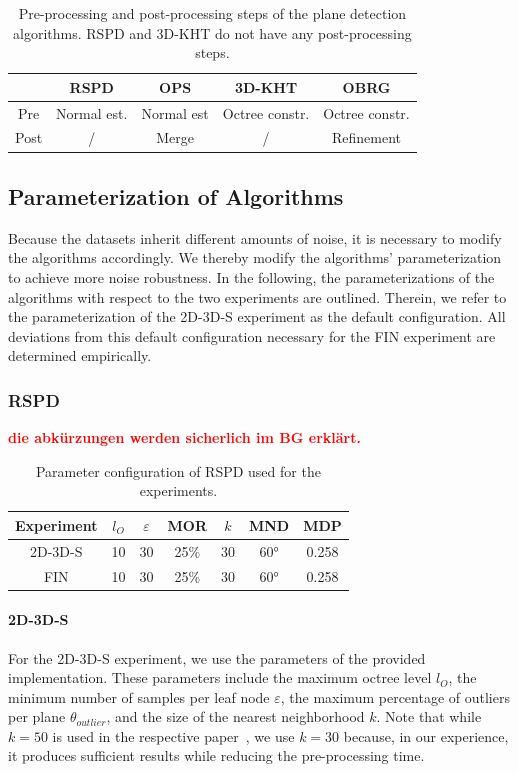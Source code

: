 \documentclass[main.tex]{subfiles}
\begin{document}
\begin{table}[H]
    \centering
    \begin{tabular}{c|cccc}
             & RSPD        & OPS        & 3D-KHT         & OBRG           \\ \hline
        Pre  & Normal est. & Normal est & Octree constr. & Octree constr. \\
        Post & /           & Merge      & /              & Refinement
    \end{tabular}
    \caption{Pre-processing and post-processing steps of the plane detection algorithms. RSPD and 3D-KHT do not have any post-processing steps.}
    \label{tab:pre-post}
\end{table}


\subsection{Parameterization of Algorithms}
Because the datasets inherit different amounts of noise, it is necessary to modify the algorithms accordingly.
We thereby modify the algorithms' parameterization to achieve more noise robustness.
In the following, the parameterizations of the algorithms with respect to the two experiments are outlined.
Therein, we refer to the parameterization of the 2D-3D-S experiment as the default configuration.
All deviations from this default configuration necessary for the FIN experiment are determined empirically.


\subsubsection{RSPD}
\textbf{\textcolor{red}{die abkürzungen werden sicherlich im BG erklärt.}}
\begin{table}[H]
    \centering
    \begin{tabular}{c|cccccc}
        Experiment & $l_O$ & $\varepsilon$ & MOR  & $k$ & MND & MDP   \\ \hline
        2D-3D-S    & 10    & 30            & 25\% & 30  & 60° & 0.258 \\
        FIN        & 10    & 30            & 25\% & 30  & 60° & 0.258
    \end{tabular}%
    \caption{Parameter configuration of RSPD used for the experiments.}
    \label{tab:rspd-param}
\end{table}

\paragraph{2D-3D-S}
For the 2D-3D-S experiment, we use the parameters of the provided implementation. These parameters include the maximum octree level $l_O$,
the minimum number of samples per leaf node $\varepsilon$, the maximum percentage of outliers per plane $\theta_{outlier}$, and
the size of the nearest neighborhood $k$. Note that while $k=50$ is used in the respective paper~\cite[Section~3.3]{Araújo_Oliveira_2020},
we use $k=30$ because, in our experience, it produces sufficient results while reducing the pre-processing time.
\end{document}
